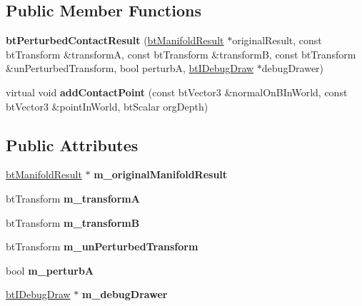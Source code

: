 \subsection*{Public Member Functions}
\begin{DoxyCompactItemize}
\item 
\mbox{\label{structbtPerturbedContactResult_a9a34b4e9a4f00e6af7f77de8302688f7}} 
{\bfseries bt\+Perturbed\+Contact\+Result} (\hyperlink{classbtManifoldResult}{bt\+Manifold\+Result} $\ast$original\+Result, const bt\+Transform \&transformA, const bt\+Transform \&transformB, const bt\+Transform \&un\+Perturbed\+Transform, bool perturbA, \hyperlink{classbtIDebugDraw}{bt\+I\+Debug\+Draw} $\ast$debug\+Drawer)
\item 
\mbox{\label{structbtPerturbedContactResult_a8e84543c981ef96eccc133d78e1e04f2}} 
virtual void {\bfseries add\+Contact\+Point} (const bt\+Vector3 \&normal\+On\+B\+In\+World, const bt\+Vector3 \&point\+In\+World, bt\+Scalar org\+Depth)
\end{DoxyCompactItemize}
\subsection*{Public Attributes}
\begin{DoxyCompactItemize}
\item 
\mbox{\label{structbtPerturbedContactResult_a8ad42c06006183d2a2e723ff6769bcb2}} 
\hyperlink{classbtManifoldResult}{bt\+Manifold\+Result} $\ast$ {\bfseries m\+\_\+original\+Manifold\+Result}
\item 
\mbox{\label{structbtPerturbedContactResult_aa78dad17b327cef2f53ecdf6a549b8e8}} 
bt\+Transform {\bfseries m\+\_\+transformA}
\item 
\mbox{\label{structbtPerturbedContactResult_a8adc56e343b98c15405a3c3d0ea01781}} 
bt\+Transform {\bfseries m\+\_\+transformB}
\item 
\mbox{\label{structbtPerturbedContactResult_ab60a34a8ed281e26742e975075f1927a}} 
bt\+Transform {\bfseries m\+\_\+un\+Perturbed\+Transform}
\item 
\mbox{\label{structbtPerturbedContactResult_a52f4917e38fd7c982893b261dfcfb5bc}} 
bool {\bfseries m\+\_\+perturbA}
\item 
\mbox{\label{structbtPerturbedContactResult_a234cc30a82d70a9c789665b7a2f21995}} 
\hyperlink{classbtIDebugDraw}{bt\+I\+Debug\+Draw} $\ast$ {\bfseries m\+\_\+debug\+Drawer}
\end{DoxyCompactItemize}
